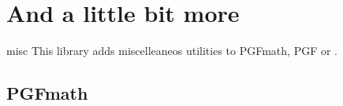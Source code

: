 %
%
%

\section{And a little bit more}
\begin{tikzlibrary}{misc}
  This library adds miscelleaneos utilities to PGFmath, PGF or \tikzname.
\end{tikzlibrary}

\subsection{PGFmath}

